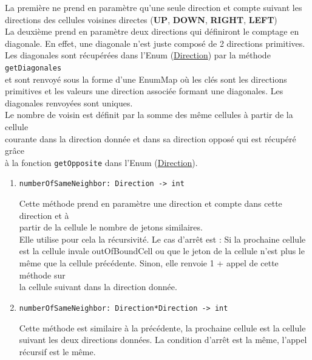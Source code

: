 \documentclass[11pt]{article}
\begin{document}
\begin{enumerate}
La première ne prend en paramètre qu'une seule direction et compte suivant les\\
directions des cellules voisines directes (\textbf{UP}, \textbf{DOWN}, \textbf{RIGHT}, \textbf{LEFT})\\

La deuxième prend en paramètre deux directions qui définiront le comptage en\\
diagonale. En effet, une diagonale n'est juste composé de 2 directions primitives.\\

Les diagonales sont récupérées dans l'Enum (\hyperref[orged4a61f]{Direction}) par la méthode \texttt{getDiagonales}\\
et sont renvoyé sous la forme d'une EnumMap où les clés sont les directions\\
primitives et les valeurs une direction associée formant une diagonales. Les\\
diagonales renvoyées sont uniques.\\

Le nombre de voisin est définit par la somme des même cellules à partir de la cellule\\
courante dans la direction donnée et dans sa direction opposé qui est récupéré grâce\\
à la fonction \texttt{getOpposite} dans l'Enum (\hyperref[orged4a61f]{Direction}).\\

\begin{enumerate}
\item \texttt{numberOfSameNeighbor: Direction -> int}
\label{sec:orgc5507bb}

Cette méthode prend en paramètre une direction et compte dans cette direction et à\\
partir de la cellule le nombre de jetons similaires.\\

Elle utilise pour cela la récursivité. Le cas d'arrêt est : Si la prochaine cellule\\
est la cellule invale outOfBoundCell ou que le jeton de la cellule n'est plus le\\
même que la cellule précédente. Sinon, elle renvoie 1 + appel de cette méthode sur\\
la cellule suivant dans la direction donnée.\\

\item \texttt{numberOfSameNeighbor: Direction*Direction -> int}
\label{sec:org5dfb1b9}

Cette méthode est similaire à la précédente, la prochaine cellule est la cellule\\
suivant les deux directions données. La condition d'arrêt est la même, l'appel\\
récursif est le même.\\
\end{enumerate}
\end{enumerate}
\end{document}
